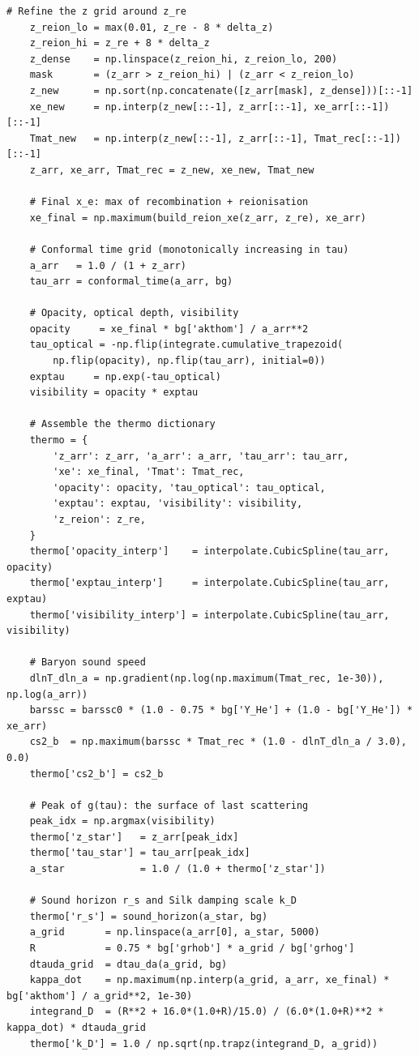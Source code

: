 \begin{codebox}
\begin{lstlisting}[style=python]
    # Refine the z grid around z_re
    z_reion_lo = max(0.01, z_re - 8 * delta_z)
    z_reion_hi = z_re + 8 * delta_z
    z_dense    = np.linspace(z_reion_hi, z_reion_lo, 200)
    mask       = (z_arr > z_reion_hi) | (z_arr < z_reion_lo)
    z_new      = np.sort(np.concatenate([z_arr[mask], z_dense]))[::-1]
    xe_new     = np.interp(z_new[::-1], z_arr[::-1], xe_arr[::-1])[::-1]
    Tmat_new   = np.interp(z_new[::-1], z_arr[::-1], Tmat_rec[::-1])[::-1]
    z_arr, xe_arr, Tmat_rec = z_new, xe_new, Tmat_new

    # Final x_e: max of recombination + reionisation
    xe_final = np.maximum(build_reion_xe(z_arr, z_re), xe_arr)

    # Conformal time grid (monotonically increasing in tau)
    a_arr   = 1.0 / (1 + z_arr)
    tau_arr = conformal_time(a_arr, bg)

    # Opacity, optical depth, visibility
    opacity     = xe_final * bg['akthom'] / a_arr**2
    tau_optical = -np.flip(integrate.cumulative_trapezoid(
        np.flip(opacity), np.flip(tau_arr), initial=0))
    exptau     = np.exp(-tau_optical)
    visibility = opacity * exptau

    # Assemble the thermo dictionary
    thermo = {
        'z_arr': z_arr, 'a_arr': a_arr, 'tau_arr': tau_arr,
        'xe': xe_final, 'Tmat': Tmat_rec,
        'opacity': opacity, 'tau_optical': tau_optical,
        'exptau': exptau, 'visibility': visibility,
        'z_reion': z_re,
    }
    thermo['opacity_interp']    = interpolate.CubicSpline(tau_arr, opacity)
    thermo['exptau_interp']     = interpolate.CubicSpline(tau_arr, exptau)
    thermo['visibility_interp'] = interpolate.CubicSpline(tau_arr, visibility)

    # Baryon sound speed
    dlnT_dln_a = np.gradient(np.log(np.maximum(Tmat_rec, 1e-30)), np.log(a_arr))
    barssc = barssc0 * (1.0 - 0.75 * bg['Y_He'] + (1.0 - bg['Y_He']) * xe_arr)
    cs2_b  = np.maximum(barssc * Tmat_rec * (1.0 - dlnT_dln_a / 3.0), 0.0)
    thermo['cs2_b'] = cs2_b

    # Peak of g(tau): the surface of last scattering
    peak_idx = np.argmax(visibility)
    thermo['z_star']   = z_arr[peak_idx]
    thermo['tau_star'] = tau_arr[peak_idx]
    a_star             = 1.0 / (1.0 + thermo['z_star'])

    # Sound horizon r_s and Silk damping scale k_D
    thermo['r_s'] = sound_horizon(a_star, bg)
    a_grid       = np.linspace(a_arr[0], a_star, 5000)
    R            = 0.75 * bg['grhob'] * a_grid / bg['grhog']
    dtauda_grid  = dtau_da(a_grid, bg)
    kappa_dot    = np.maximum(np.interp(a_grid, a_arr, xe_final) * bg['akthom'] / a_grid**2, 1e-30)
    integrand_D  = (R**2 + 16.0*(1.0+R)/15.0) / (6.0*(1.0+R)**2 * kappa_dot) * dtauda_grid
    thermo['k_D'] = 1.0 / np.sqrt(np.trapz(integrand_D, a_grid))


\end{lstlisting}
\end{codebox}
